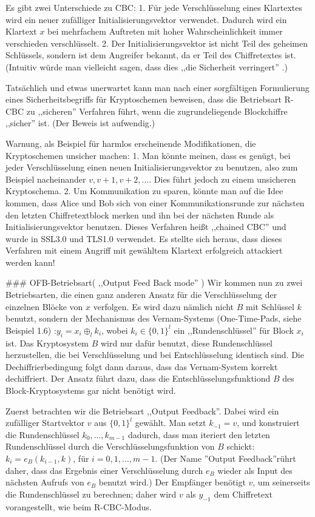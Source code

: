 \documentclass[a4paper]{article}
\begin{document}
\begin{multicols}{3}
Es gibt zwei Unterschiede zu CBC:
1. Für jede Verschlüsselung eines Klartextes wird ein neuer zufälliger Initialisierungsvektor verwendet. Dadurch wird ein Klartext $x$ bei mehrfachem Auftreten mit hoher Wahrscheinlichkeit immer verschieden verschlüsselt.
2. Der Initialisierungsvektor ist nicht Teil des geheimen Schlüssels, sondern ist dem Angreifer bekannt, da er Teil des Chiffretextes ist. (Intuitiv würde man vielleicht sagen, dass dies ,,die Sicherheit verringert'' .)

Tatsächlich und etwas unerwartet kann man nach einer sorgfältigen Formulierung eines Sicherheitsbegriffs für Kryptoschemen beweisen, dass die Betriebsart R-CBC zu ,,sicheren'' Verfahren führt, wenn die zugrundeliegende Blockchiffre ,,sicher'' ist. (Der Beweis ist 
aufwendig.)

Warnung, als Beispiel für harmlos erscheinende Modifikationen, die Kryptoschemen unsicher machen:
1. Man könnte meinen, dass es genügt, bei jeder Verschlüsselung einen neuen Initialisierungsvektor zu benutzen, also zum Beispiel nacheinander $v,v+1,v+2,...$. Dies führt jedoch zu einem unsicheren Kryptoschema.
2. Um Kommunikation zu sparen, könnte man auf die Idee kommen, dass Alice und Bob sich von einer Kommunikationsrunde zur nächsten den letzten Chiffretextblock merken und ihn bei der nächsten Runde als Initialisierungsvektor benutzen. Dieses Verfahren heißt ,,chained CBC'' und wurde in SSL3.0 und TLS1.0 verwendet. Es stellte sich heraus, dass dieses Verfahren mit einem Angriff mit gewähltem Klartext erfolgreich attackiert werden kann!

### OFB-Betriebsart( ,,Output Feed Back mode'' )
Wir kommen nun zu zwei Betriebsarten, die einen ganz anderen Ansatz für die Verschlüsselung der einzelnen Blöcke von $x$ verfolgen. Es wird dazu nämlich nicht $B$ mit Schlüssel $k$ benutzt, sondern der Mechanismus des Vernam-Systems (One-Time-Pads, siehe Beispiel 1.6) :$y_i=x_i\oplus_l k_i$, wobei $k_i\in\{0,1\}^l$ ein ,,Rundenschlüssel'' für Block $x_i$ ist. Das Kryptosystem $B$ wird nur dafür benutzt, diese Rundenschlüssel herzustellen, die bei Verschlüsselung und bei Entschlüsselung identisch sind. Die Dechiffrierbedingung folgt dann daraus, dass das Vernam-System korrekt dechiffriert. Der Ansatz führt dazu, dass die Entschlüsselungsfunktiond $B$ des Block-Kryptosystems gar nicht benötigt wird.

Zuerst betrachten wir die Betriebsart ,,Output Feedback''. Dabei wird ein zufälliger Startvektor $v$ aus $\{0,1\}^l$ gewählt. Man setzt $k_{-1}=v$, und konstruiert die Rundenschlüssel $k_0,...,k_{m-1}$ dadurch, dass man iteriert den letzten Rundenschlüssel durch die Verschlüsselungsfunktion von $B$ schickt: $k_i=e_B(k_{i-1}, k)$, für $i=0,1,...,m-1$. (Der Name ''Output Feedback''rührt daher, dass das Ergebnis einer Verschlüsselung durch $e_B$ wieder als Input des nächsten Aufrufs von $e_B$ benutzt wird.) Der Empfänger benötigt $v$, um seinerseits die Rundenschlüssel zu berechnen; daher wird $v$ als $y_{-1}$ dem Chiffretext vorangestellt, wie beim R-CBC-Modus.


\end{multicols}
\end{document}
